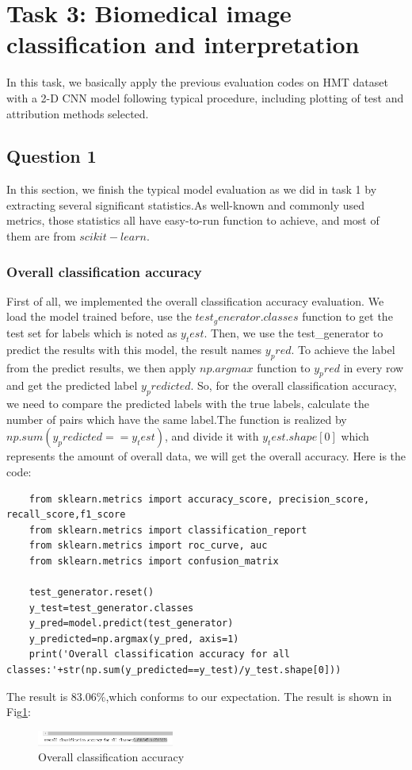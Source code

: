 \documentclass[conference]{IEEEtran}
\begin{document}
\section{Task 3: Biomedical image classification and interpretation}
In this task, we basically apply the previous evaluation codes on HMT dataset with a 2-D CNN model following typical procedure, including plotting of test and attribution methods selected.
\subsection{Question 1}
In this section, we finish the typical model evaluation as we did in task 1 by extracting several significant statistics.As well-known and commonly used metrics, those statistics all have easy-to-run
function to achieve, and most of them are from $scikit-learn$.
\subsubsection{Overall classification accuracy}
First of all, we implemented the overall classification accuracy evaluation. We load the model trained before, use the $test_generator.classes$ function to get the test set for labels which is noted as $y_test$.
Then, we use the test_generator to predict the results with this model, the result names $y_pred$. To achieve the label from the predict results, we then apply $np.argmax$ function to $y_pred$ in every row and get the predicted label $y_predicted$. 
So, for the overall classification accuracy, we need to compare the predicted labels with the true labels, calculate the number of pairs which have the same label.The function is realized by $np.sum(y_predicted==y_test)$, and divide it with $y_test.shape[0]$ which represents the amount of overall data, we will get the overall accuracy.
Here is the code:
\begin{lstlisting}
    from sklearn.metrics import accuracy_score, precision_score, recall_score,f1_score
    from sklearn.metrics import classification_report
    from sklearn.metrics import roc_curve, auc
    from sklearn.metrics import confusion_matrix

    test_generator.reset()
    y_test=test_generator.classes
    y_pred=model.predict(test_generator)
    y_predicted=np.argmax(y_pred, axis=1)
    print('Overall classification accuracy for all classes:'+str(np.sum(y_predicted==y_test)/y_test.shape[0]))
\end{lstlisting}
The result is 83.06\%,which conforms to our expectation. The result is shown in Fig\ref{Fig.t3q1}:
\begin{figure}[h] 
    \centering
    \includegraphics[width=0.4\textwidth]{T3Q1a.png}
    \caption{Overall classification accuracy}
    \label{Fig.t3q1}
\end{figure}
\end{document}
